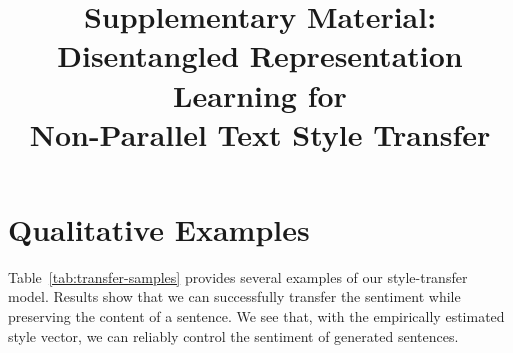 \documentclass[letterpaper]{article}
\title{Supplementary Material:\\Disentangled Representation Learning for\\Non-Parallel Text Style Transfer}
\date{}
\author{}
\begin{document}
\maketitle
\graphicspath{{images/}}

\newcommand{\tabh}[1]{\multicolumn{1}{c|}{\textbf{#1}}}
\newcommand{\tabc}[2]{\multicolumn{1}{|c||}{\multirow{#1}{*}{\textbf{#2}}}}
\newcommand{\loss}[1]{J_{\text{#1}}}

\renewcommand\thesection{\Alph{section}}

\section{Qualitative Examples}

Table~\ref{tab:transfer-samples} provides several examples of our style-transfer model.
Results show that we can successfully transfer the sentiment while preserving the content of a sentence.
We see that, with the empirically estimated style vector, we can reliably control the sentiment of generated sentences.
\end{document}
